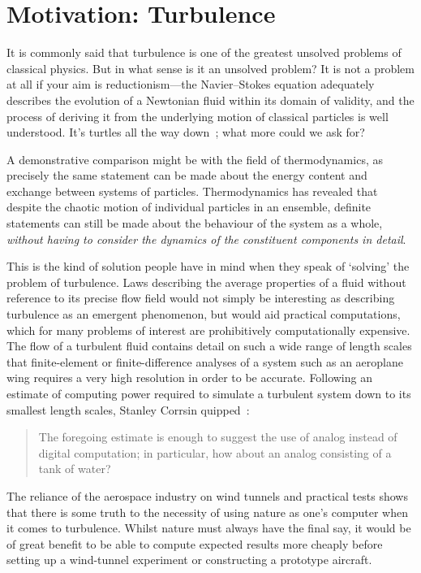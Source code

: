 \section{Motivation: Turbulence}

It is commonly said that turbulence is one of the greatest unsolved problems of classical physics. But in what sense is it an unsolved problem? It is not a problem at all if your aim is reductionism---the Navier--Stokes equation adequately describes the evolution of a Newtonian fluid within its domain of validity, and the process of deriving it from the underlying motion of classical particles is well understood. It's turtles all the way down~\cite[p 1]{hawking_brief_1988}; what more could we ask for?

A demonstrative comparison might be with the field of thermodynamics, as precisely the same statement can be made about the energy content and exchange between systems of particles. Thermodynamics has revealed that despite the chaotic motion of individual particles in an ensemble, definite statements can still be made about the behaviour of the system as a whole, \emph{without having to consider the dynamics of the constituent components in detail}.

This is the kind of solution people have in mind when they speak of `solving' the problem of turbulence. Laws describing the average properties of a fluid without reference to its precise flow field would not simply be interesting as describing turbulence as an emergent phenomenon, but would aid practical computations, which for many problems of interest are prohibitively computationally expensive. The flow of a turbulent fluid contains detail on such a  wide range of length scales that finite-element or finite-difference analyses of a system such as an aeroplane wing requires a very high resolution in order to be accurate. Following an estimate of computing power required to simulate a turbulent system down to its smallest length scales, Stanley Corrsin quipped~\cite{corrsin_turbulent_1961}:
\begin{quote}
The foregoing estimate  is enough to suggest the use of analog instead of digital  computation; in particular, how about an analog consisting of a tank of water?
\end{quote}
The reliance of the aerospace industry on wind tunnels and practical tests shows that there is some truth to the necessity of using nature as one's computer when it comes to turbulence. Whilst nature must always have the final say, it would be of great benefit to be able to compute expected results more cheaply before setting up a wind-tunnel experiment or constructing a prototype aircraft.

